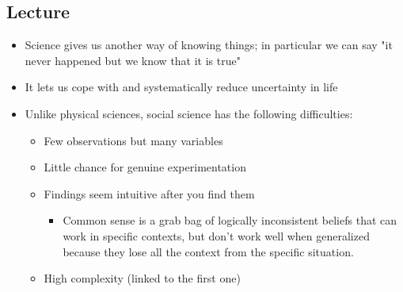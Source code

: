 \documentclass[11pt]{article}
\begin{document}
\subsection{Lecture}
\label{sec:org9f11c85}
\begin{itemize}
\item Science gives us another way of knowing things; in particular we can say "it
never happened but we know that it is true"
\item It lets us cope with and systematically reduce uncertainty in life
\item Unlike physical sciences, social science has the following difficulties:
\begin{itemize}
\item Few observations but many variables
\item Little chance for genuine experimentation
\item Findings seem intuitive after you find them
\begin{itemize}
\item Common sense is a grab bag of logically inconsistent beliefs that can work in
specific contexts, but don't work well when generalized because they lose all
the context from the specific situation.
\end{itemize}
\item High complexity (linked to the first one)
\end{itemize}
\end{itemize}
\end{document}
